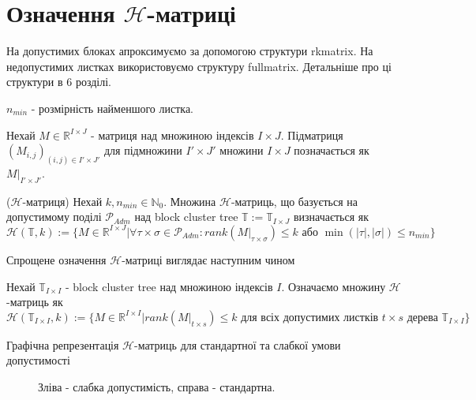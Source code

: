 \documentclass[12pt]{report}
\begin{document}
	\section{Означення $\mathcal{H}$-матриці}
	\hspace{0.8cm} На допустимих блоках апроксимуємо за допомогою структури rkmatrix. На недопустимих листках використовуємо структуру fullmatrix. Детальніше про ці структури в 6 розділі.
	\par $n_{min}$ - розмірність найменшого листка.
	\begin{Def}
	Нехай $M\in\mathbb{R}^{I\times J}$ - матриця над множиною індексів $I\times J$. Підматриця $(M_{i,j})_{(i,j)\in I'\times J'}$ для підмножини $I'\times J'$ множини $I\times J$ позначається як $M|_{I'\times J'}$.
	\end{Def}
	\begin{Def}
	($\mathcal{H}$-матриця) Нехай $k,n_{min}\in \mathbb{N}_0$. Множина $\mathcal{H}$-матриць, що базується на допустимому поділі $\mathcal{P}_{Adm}$ над block cluster tree $\mathbb{T}:=\mathbb{T}_{I\times J}$ визначається як 
	$$\mathcal{H}(\mathbb{T},k):=\{M\in\mathbb{R}^{I\times J}|\forall\tau\times\sigma\in\mathcal{P}_{Adm}:rank(M|_{\tau\times\sigma})\le k \text{ або } \min(|\tau|,|\sigma|)\le n_{min} \}$$ 
	\end{Def}
	\par Спрощене означення $\mathcal{H}$-матриці виглядає наступним чином 
	\begin{Def}
	Нехай $\mathbb{T}_{I\times I}$ - block cluster tree над множиною індексів $I$. Означаємо множину $\mathcal{H}$-матриць як
	$$\mathcal{H}(\mathbb{T}_{I\times I},k):=\{M\in\mathbb{R}^{I\times I}|rank(M|_{t\times s})\le k \text{ для всіх допустимих листків } t\times s \text{ дерева } \mathbb{T}_{I\times I} \}$$
	\end{Def}
	\par Графічна репрезентація $\mathcal{H}$-матриць для стандартної та слабкої умови допустимості
	\begin{figure}[bh]
			\caption{Зліва - слабка допустимість, справа - стандартна.}
		\end{figure}
\end{document}
